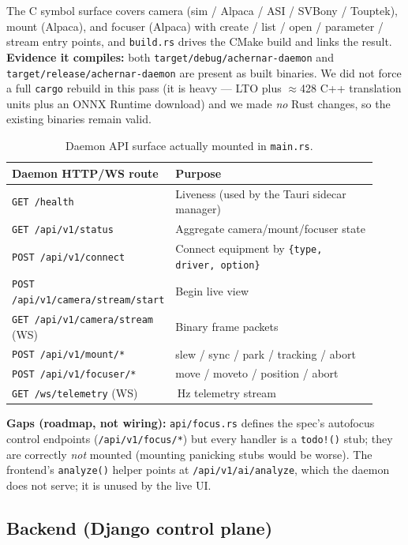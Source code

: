 \documentclass[11pt]{article}
\newcommand{\fn}[1]{\texttt{#1}}
\begin{document}
\noindent The C symbol surface covers camera (sim / Alpaca / ASI / SVBony / Touptek), mount (Alpaca),
and focuser (Alpaca) with create / list / open / parameter / stream entry points, and \fn{build.rs}
drives the CMake build and links the result. \textbf{Evidence it compiles:} both
\fn{target/debug/achernar-daemon} and \fn{target/release/achernar-daemon} are present as built binaries.
We did not force a full \texttt{cargo} rebuild in this pass (it is heavy --- LTO plus $\approx$428 C++
translation units plus an ONNX Runtime download) and we made \emph{no} Rust changes, so the existing
binaries remain valid.

\begin{table}[h]
\centering
\renewcommand{\arraystretch}{1.25}
\begin{tabular}{>{\raggedright\arraybackslash}p{0.30\linewidth} >{\raggedright\arraybackslash}p{0.62\linewidth}}
\toprule
\textbf{Daemon HTTP/WS route} & \textbf{Purpose} \\
\midrule
\texttt{GET /health} & Liveness (used by the Tauri sidecar manager) \\
\texttt{GET /api/v1/status} & Aggregate camera/mount/focuser state \\
\texttt{POST /api/v1/connect} & Connect equipment by \texttt{\{type, driver, option\}} \\
\texttt{POST /api/v1/camera/stream/start} & Begin live view \\
\texttt{GET /api/v1/camera/stream} (WS) & Binary frame packets \\
\texttt{POST /api/v1/mount/*} & slew / sync / park / tracking / abort \\
\texttt{POST /api/v1/focuser/*} & move / moveto / position / abort \\
\texttt{GET /ws/telemetry} (WS) & 1\,Hz telemetry stream \\
\bottomrule
\end{tabular}
\caption{Daemon API surface actually mounted in \fn{main.rs}.}
\end{table}

\noindent\textbf{Gaps (roadmap, not wiring):} \fn{api/focus.rs} defines the spec's autofocus control
endpoints (\texttt{/api/v1/focus/*}) but every handler is a \texttt{todo!()} stub; they are correctly
\emph{not} mounted (mounting panicking stubs would be worse). The frontend's \texttt{analyze()} helper
points at \texttt{/api/v1/ai/analyze}, which the daemon does not serve; it is unused by the live UI.

\subsection{Backend (Django control plane)}
\end{document}
